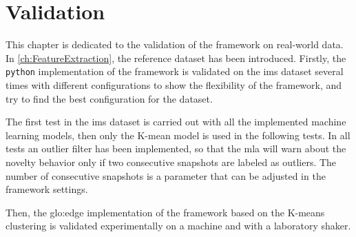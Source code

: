 \chapter{Validation}
\label{sec:Validation}

This chapter is dedicated to the validation of the framework on real-world data. In \autoref{ch:FeatureExtraction}, the reference dataset \cite{lee2007bearingdataset} has been introduced. Firstly, the \texttt{python} implementation of the framework is validated on the \gls{ims} dataset several times with different configurations to show the flexibility of the framework, and try to find the best configuration for the dataset. 

The first test in the \gls{ims} dataset is carried out with all the implemented machine learning models, then only the K-mean model is used in the following tests. In all tests an outlier filter has been implemented, so that the \gls{mla} will warn about the novelty behavior only if two consecutive snapshots are labeled as outliers. The number of consecutive snapshots is a parameter that can be adjusted in the framework settings.

Then, the \gls{glo:edge} implementation of the framework based on the K-means clustering is validated experimentally on a machine and with a laboratory shaker.



\maskongoig{







}